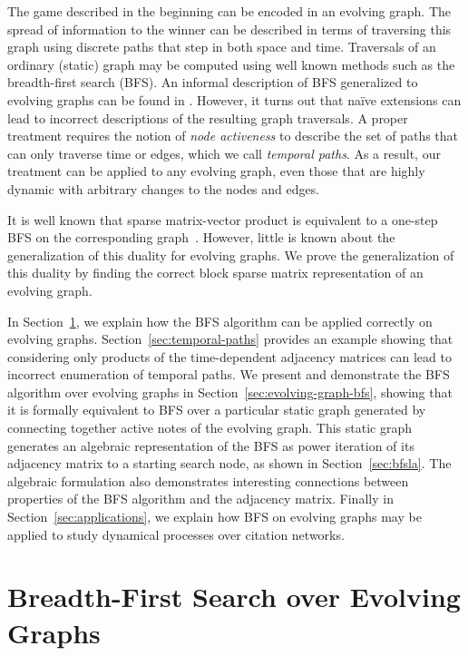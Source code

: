 \documentclass[10pt,conference,compsocconf]{IEEEtran}
\theoremstyle{definition}
\begin{document}
The game described in the beginning can be encoded in an evolving graph.
The spread of information to the winner can be described in terms of traversing
this graph using discrete paths that step in both space and time.
Traversals of an ordinary (static) graph may be computed using well known methods
such as the breadth-first search (BFS). An informal description of BFS generalized
to evolving graphs can be found in \cite{tmml09}.
However, it turns out that na\"ive extensions can lead to incorrect descriptions of
the resulting graph traversals. A proper treatment requires the notion of
\emph{node activeness} to describe the set of paths that can only traverse time
or edges, which we call \textit{temporal paths}.
As a result, our treatment can be applied to any evolving graph, even those that
are highly dynamic with arbitrary changes to the nodes and edges.

It is well known that sparse matrix-vector product is equivalent to a
one-step BFS on the corresponding graph~\cite[Sec. 1.1]{kegi11}.
However, little is known about the generalization of this duality for evolving graphs.
We prove the generalization of this duality by finding
the correct block sparse matrix representation of an evolving graph.

In Section~\ref{sec:breadth-first-search}, we explain how the BFS algorithm can be applied correctly on
evolving graphs. Section~\ref{sec:temporal-paths} provides an example showing that considering
only products of the time-dependent adjacency matrices can lead to incorrect enumeration
of temporal paths. We present and demonstrate the BFS algorithm over evolving graphs
in Section~\ref{sec:evolving-graph-bfs}, showing that it is formally equivalent to
BFS over a particular static graph generated by connecting
together active notes of the evolving graph. This static graph generates an algebraic
representation of the BFS as power iteration of its adjacency matrix to a starting
search node, as shown in Section~\ref{sec:bfsla}. The algebraic formulation also
demonstrates interesting connections between properties of the BFS algorithm and
the adjacency matrix. Finally in Section~\ref{sec:applications},
we explain how BFS on evolving graphs may be applied to study dynamical processes
over citation networks.


\section{Breadth-First Search over Evolving Graphs}
\label{sec:breadth-first-search}
\end{document}
